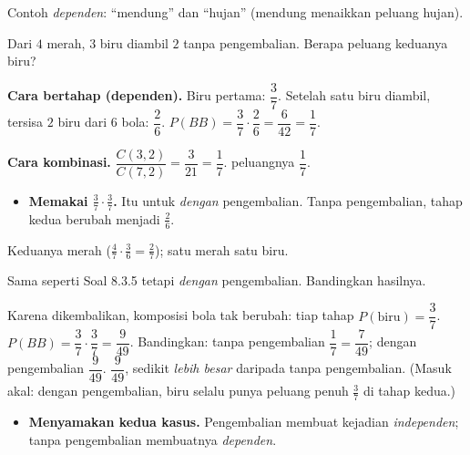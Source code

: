 \begin{variasi}
Contoh \emph{dependen}: ``mendung'' dan ``hujan'' (mendung menaikkan peluang
hujan).
\end{variasi}

\begin{soalbox}{}
Dari $4$ merah, $3$ biru diambil $2$ tanpa pengembalian. Berapa peluang keduanya
biru?
\end{soalbox}

\jawab
\textbf{Cara bertahap (dependen).}
 Biru pertama: $\dfrac{3}{7}$.
 Setelah satu biru diambil, tersisa $2$ biru dari $6$ bola:
$\dfrac{2}{6}$.
 $P(BB)=\dfrac{3}{7}\cdot\dfrac{2}{6}=\dfrac{6}{42}=\dfrac17$.

\textbf{Cara kombinasi.} $\dfrac{C(3,2)}{C(7,2)}=\dfrac{3}{21}=\dfrac17$.
\jadi peluangnya $\dfrac17$.

\begin{jebakan}
\begin{itemize}[leftmargin=*,topsep=2pt]
  \item \textbf{Memakai $\frac37\cdot\frac37$.} Itu untuk \emph{dengan}
  pengembalian. Tanpa pengembalian, tahap kedua berubah menjadi $\frac26$.
\end{itemize}
\end{jebakan}

\begin{variasi}
Keduanya merah ($\frac47\cdot\frac36=\frac27$); satu merah satu biru.
\end{variasi}

\begin{soalbox}{}
Sama seperti Soal 8.3.5 tetapi \emph{dengan} pengembalian. Bandingkan hasilnya.
\end{soalbox}

\jawab
{} Karena dikembalikan, komposisi bola tak berubah: tiap tahap
$P(\text{biru})=\dfrac37$.
 $P(BB)=\dfrac37\cdot\dfrac37=\dfrac{9}{49}$.
 Bandingkan: tanpa pengembalian $\dfrac17=\dfrac{7}{49}$; dengan
pengembalian $\dfrac{9}{49}$.
\jadi $\dfrac{9}{49}$, sedikit \emph{lebih besar} daripada tanpa pengembalian.
(Masuk akal: dengan pengembalian, biru selalu punya peluang penuh $\frac37$ di
tahap kedua.)

\begin{jebakan}
\begin{itemize}[leftmargin=*,topsep=2pt]
  \item \textbf{Menyamakan kedua kasus.} Pengembalian membuat kejadian
  \emph{independen}; tanpa pengembalian membuatnya \emph{dependen}.
\end{itemize}
\end{jebakan}

